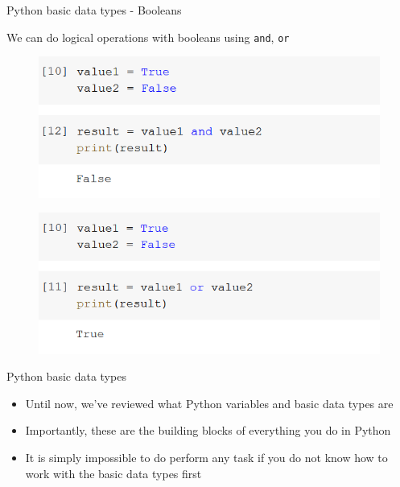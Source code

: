 \documentclass[aspectratio=169]{beamer}
\begin{document}
\begin{frame}{Python basic data types - Booleans}

	We can do logical operations with booleans using \texttt{and}, \texttt{or}

	\begin{multicols}{2}

		\begin{figure}
			\centering
			\includegraphics[width=\linewidth]{img/and.png}
		\end{figure}
		\begin{figure}
			\centering
			\includegraphics[width=\linewidth]{img/or.png}
		\end{figure}

	\end{multicols}

\end{frame}

\begin{frame}{Python basic data types}

	\begin{itemize}
		\item Until now, we've reviewed what Python variables and basic data types are
		\item Importantly, these are the building blocks of everything you do in Python
		\item It is simply impossible to do perform any task if you do not know how to work with the basic data types first
	\end{itemize}

\end{frame}
\end{document}
